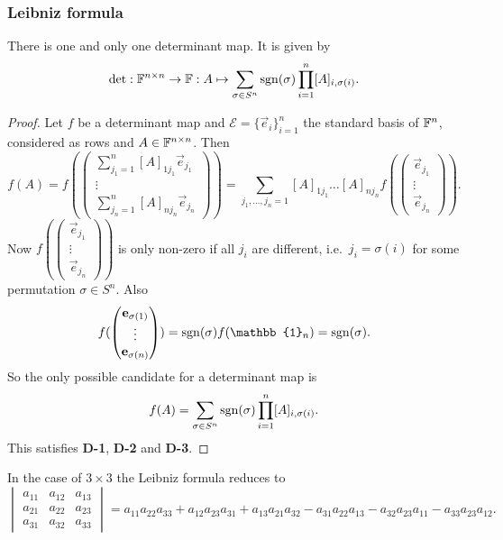 \subsubsection{Leibniz formula}
\begin{proposition} \label{LiebnizFormula}
There is one and only one determinant map. It is given by
\[ \det: \mathbb{F}^{n\times n}\to \mathbb{F}: A\mapsto \sum_{\sigma\in S^n}\operatorname{sgn}(\sigma)\prod_{i=1}^n[A]_{i,\sigma(i)}. \]
\end{proposition}
\begin{proof}
Let $f$ be a determinant map and $\mathcal{E} = \{\vec{e}_i\}_{i=1}^n$ the standard basis of $\mathbb{F}^n$, considered as rows and $A\in\mathbb{F}^{n\times n}$. Then
\[ f(A) = f(\begin{pmatrix}
\sum_{j_1=1}^n [A]_{1j_1}\vec{e}_{j_1} \\ \vdots \\ \sum_{j_n=1}^n [A]_{nj_n}\vec{e}_{j_n}
\end{pmatrix}) = \sum_{j_1,\ldots, j_n=1}[A]_{1j_1}\ldots[A]_{nj_n}f(\begin{pmatrix}
\vec{e}_{j_1} \\ \vdots \\ \vec{e}_{j_n}
\end{pmatrix}). \]
Now $f(\begin{pmatrix}
\vec{e}_{j_1} \\ \vdots \\ \vec{e}_{j_n}
\end{pmatrix})$ is only non-zero if all $j_i$ are different, i.e.\ $j_i = \sigma(i)$ for some permutation $\sigma\in S^n$. Also
\[ f(\begin{pmatrix}
\vec{e}_{\sigma(1)} \\ \vdots \\ \vec{e}_{\sigma(n)}
\end{pmatrix}) = \sgn(\sigma)f(\mathbb{1}_n) = \sgn(\sigma). \]
So the only possible candidate for a determinant map is
\[ f(A) = \sum_{\sigma\in S^n}\operatorname{sgn}(\sigma)\prod_{i=1}^n[A]_{i,\sigma(i)}. \]
This satisfies \textbf{D-1}, \textbf{D-2} and \textbf{D-3}.
\end{proof}
In the case of $3\times 3$ the Leibniz formula reduces to
\[ \begin{vmatrix}
a_{11} & a_{12} & a_{13} \\
a_{21} & a_{22} & a_{23} \\
a_{31} & a_{32} & a_{33}
\end{vmatrix} = a_{11}a_{22}a_{33} + a_{12}a_{23}a_{31} + a_{13}a_{21}a_{32} - a_{31}a_{22}a_{13} - a_{32}a_{23}a_{11} - a_{33}a_{23}a_{12}. \]
